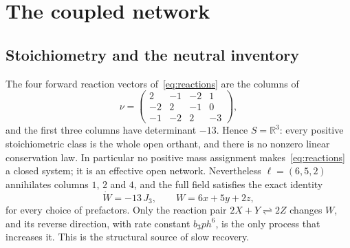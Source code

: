 \documentclass[11pt,a4paper]{article}
\theoremstyle{plain}
\theoremstyle{definition}
\theoremstyle{remark}
\newcommand{\R}{\mathbb R}
\begin{document}
\section{The coupled network}
\label{sec:coupled-proof}

\subsection{Stoichiometry and the neutral inventory}
The four forward reaction vectors of~\eqref{eq:reactions} are the columns of
\begin{equation}\label{eq:stoich}
 \nu=\begin{pmatrix}2&-1&-2&1\\-2&2&-1&0\\-1&-2&2&-3\end{pmatrix},
\end{equation}
and the first three columns have determinant $-13$. Hence $S=\R^3$: every positive stoichiometric class is the whole open orthant, and there is no nonzero linear conservation law. In particular no positive mass assignment makes~\eqref{eq:reactions} a closed system; it is an effective open network. Nevertheless $\ell=(6,5,2)$ annihilates columns $1$, $2$ and $4$, and the full field satisfies the exact identity
\begin{equation}\label{eq:neutral}
 \dot W=-13\,J_3,\qquad W=6x+5y+2z ,
\end{equation}
for every choice of prefactors. Only the reaction pair $2X+Y\rightleftharpoons2Z$ changes $W$, and its reverse direction, with rate constant $b_3ph^6$, is the only process that increases it. This is the structural source of slow recovery.
\end{document}
